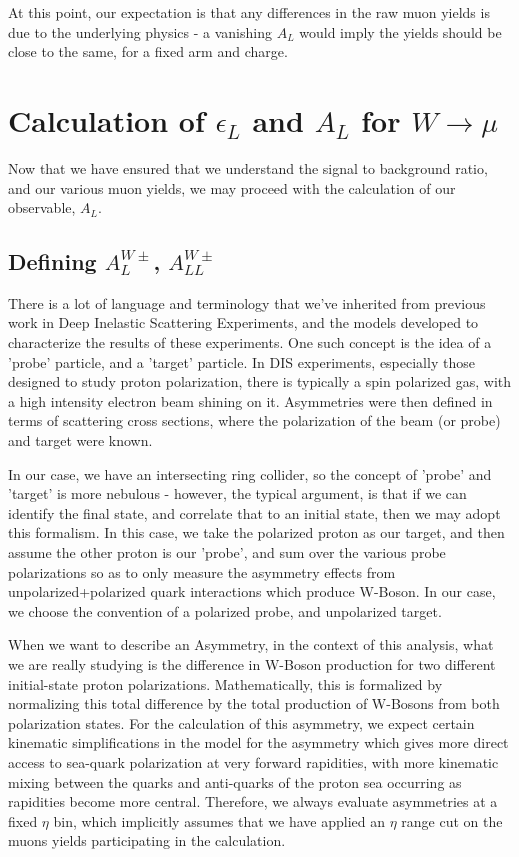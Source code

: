 At this point, our expectation is that any differences in the raw muon yields is
due to the underlying physics - a vanishing $A_L$ would imply the yields should
be close to the same, for a fixed arm and charge.

\clearpage
\section{Calculation of $\epsilon_L$ and $A_{L}$ for $W\rightarrow\mu$}

Now that we have ensured that we understand the signal to background ratio, and
our various muon yields, we may proceed with the calculation of our observable,
$A_L$. 

\subsection{Defining $A_L^{W\pm}$, $A_{LL}^{W\pm}$}
\label{sec:calculate_al}

There is a lot of language and terminology that we've inherited from previous
work in Deep Inelastic Scattering Experiments, and the models developed to
characterize the results of these experiments. One such concept is the idea of a
'probe' particle, and a 'target' particle. In DIS experiments, especially those
designed to study proton polarization, there is typically a spin polarized gas,
with a high intensity electron beam shining on it. Asymmetries were then defined
in terms of scattering cross sections, where the polarization of the beam (or
probe) and target were known.

In our case, we have an intersecting ring collider, so the concept of 'probe'
and 'target' is more nebulous - however, the typical argument, is that if we can
identify the final state, and correlate that to an initial state, then we may
adopt this formalism. In this case, we take the polarized proton as our target,
and then assume the other proton is our 'probe', and sum over the various probe
polarizations so as to only measure the asymmetry effects from
unpolarized+polarized quark interactions which produce W-Boson. In our case, we
choose the convention of a polarized probe, and unpolarized target.

When we want to describe an Asymmetry, in the context of this analysis, what we
are really studying is the difference in W-Boson production for two different
initial-state proton polarizations. Mathematically, this is formalized by
normalizing this total difference by the total production of W-Bosons from both
polarization states. For the calculation of this asymmetry, we expect certain
kinematic simplifications in the model for the asymmetry which gives more direct
access to sea-quark polarization at very forward rapidities, with more kinematic
mixing between the quarks and anti-quarks of the proton sea occurring as
rapidities become more central. Therefore, we always evaluate asymmetries at a
fixed $\eta$ bin, which implicitly assumes that we have applied an $\eta$ range
cut on the muons yields participating in the calculation.

